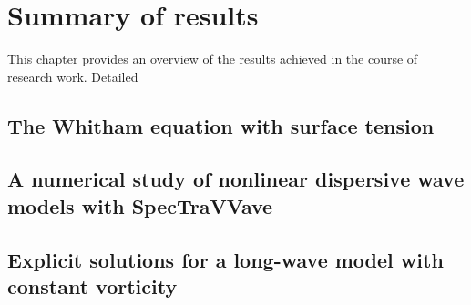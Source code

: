 \chapter{Summary of results}

This chapter provides an overview of the results achieved in the course of research work. 
Detailed 
%



%
\section{The Whitham equation with surface tension}





%
\section{A numerical study of nonlinear dispersive wave models with SpecTraVVave}





\section{Explicit solutions for a long-wave model with constant vorticity}
